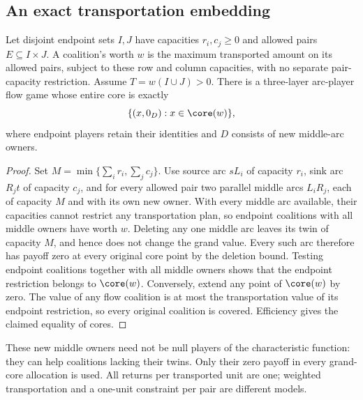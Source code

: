\subsection{An exact transportation embedding}
\begin{proposition}\label{flow:embedding}
Let disjoint endpoint sets $I,J$ have capacities $r_i,c_j\ge0$ and
allowed pairs $E\subseteq I\times J$. A coalition's worth $w$ is the
maximum transported amount on its allowed pairs, subject to these row
and column capacities, with no separate pair-capacity restriction.
Assume $T=w(I\cup J)>0$. There is a three-layer arc-player flow game
whose entire core is exactly
\[
                  \{(x,0_D):x\in\core(w)\},
\]
where endpoint players retain their identities and $D$ consists of new
middle-arc owners.
\end{proposition}
\begin{proof}
Set $M=\min\{\sum_i r_i,\sum_j c_j\}$. Use source arc $sL_i$ of
capacity $r_i$, sink arc $R_jt$ of capacity $c_j$, and for every allowed
pair two parallel middle arcs $L_iR_j$, each of capacity $M$ and with
its own new owner. With every middle arc available, their capacities
cannot restrict any transportation plan, so endpoint coalitions with
all middle owners have worth $w$.
Deleting any one middle arc leaves its twin of capacity $M$, and hence
does not change the grand value. Every such arc therefore has payoff
zero at every original core point by the deletion bound. Testing endpoint
coalitions together with all middle owners shows that the endpoint
restriction belongs to $\core(w)$. Conversely, extend any point of
$\core(w)$ by zero. The value of any flow coalition is at most the
transportation value of its endpoint restriction, so every original
coalition is covered. Efficiency gives the claimed equality of cores.
\end{proof}
These new middle owners need not be null players of the characteristic
function: they can help coalitions lacking their twins. Only their
zero payoff in every grand-core allocation is used. All returns per
transported unit are one; weighted transportation and a one-unit
constraint per pair are different models.

